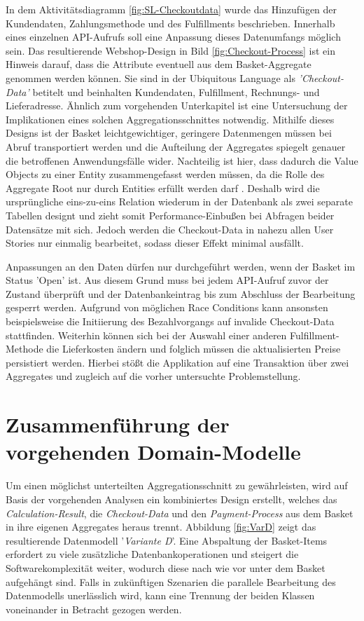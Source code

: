 In dem Aktivitätsdiagramm \ref{fig:SL-Checkoutdata} wurde das Hinzufügen der Kundendaten, Zahlungsmethode und des Fulfillments beschrieben. Innerhalb eines einzelnen API-Aufrufs soll eine Anpassung dieses Datenumfangs möglich sein. Das resultierende Webshop-Design in Bild \ref{fig:Checkout-Process} ist ein Hinweis darauf, dass die Attribute eventuell aus dem Basket-Aggregate genommen werden können. Sie sind in der Ubiquitous Language als \emph{'Checkout-Data'} betitelt und beinhalten Kundendaten, Fulfillment, Rechnungs- und Lieferadresse. Ähnlich zum vorgehenden Unterkapitel ist eine Untersuchung der Implikationen eines solchen Aggregationsschnittes notwendig. Mithilfe dieses Designs ist der Basket leichtgewichtiger, geringere Datenmengen müssen bei Abruf transportiert werden und die Aufteilung der Aggregates spiegelt genauer die betroffenen Anwendungsfälle wider. Nachteilig ist hier, dass dadurch die Value Objects zu einer Entity zusammengefasst werden müssen, da die Rolle des Aggregate Root nur durch Entities erfüllt werden darf \cite[S. 129]{Evans.2011}. Deshalb wird die ursprüngliche eins-zu-eins Relation wiederum in der Datenbank als zwei separate Tabellen designt und zieht somit Performance-Einbußen bei Abfragen beider Datensätze mit sich. Jedoch werden die Checkout-Data in nahezu allen User Stories nur einmalig bearbeitet, sodass dieser Effekt minimal ausfällt. 

Anpassungen an den Daten dürfen nur durchgeführt werden, wenn der Basket im Status 'Open' ist. Aus diesem Grund muss bei jedem API-Aufruf zuvor der Zustand überprüft und der Datenbankeintrag bis zum Abschluss der Bearbeitung gesperrt werden. Aufgrund von möglichen Race Conditions kann ansonsten beispielsweise die Initiierung des Bezahlvorgangs auf invalide Checkout-Data stattfinden. Weiterhin können sich bei der Auswahl einer anderen Fulfillment-Methode die Lieferkosten ändern und folglich müssen die aktualisierten Preise persistiert werden. Hierbei stößt die Applikation auf eine Transaktion über zwei Aggregates und zugleich auf die vorher untersuchte Problemstellung.


\section{Zusammenführung der vorgehenden Domain-Modelle}

Um einen möglichst unterteilten Aggregationsschnitt zu gewährleisten, wird auf Basis der vorgehenden Analysen ein kombiniertes Design erstellt, welches das \emph{Calculation-Result}, die \emph{Checkout-Data} und den \emph{Payment-Process} aus dem Basket in ihre eigenen Aggregates heraus trennt. Abbildung \ref{fig:VarD} zeigt das resultierende Datenmodell '\emph{Variante D}'. Eine Abspaltung der Basket-Items erfordert zu viele zusätzliche Datenbankoperationen und steigert die Softwarekomplexität weiter, wodurch diese nach wie vor unter dem Basket aufgehängt sind. Falls in zukünftigen Szenarien die parallele Bearbeitung des Datenmodells unerlässlich wird, kann eine Trennung der beiden Klassen voneinander in Betracht gezogen werden.  

